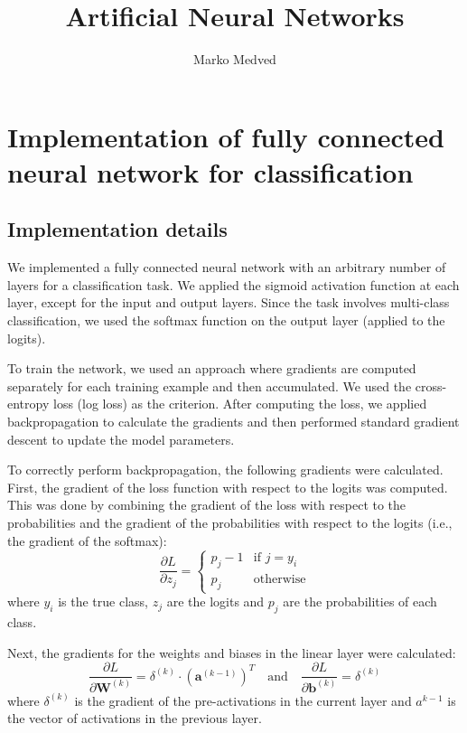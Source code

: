 \documentclass[9pt]{IEEEtran}
\title{\vspace{0ex}
Artificial Neural Networks}
\author{Marko Medved\vspace{-4.0ex}}
\begin{document}
\maketitle

\section{Implementation of fully connected neural network for classification}
\subsection{Implementation details}
We implemented a fully connected neural network with an arbitrary number of layers for
 a classification task. We applied the sigmoid activation function at each layer, except
  for the input and output layers. Since the task involves multi-class classification,
   we used the softmax function on the output layer (applied to the logits).

To train the network, we used an approach where gradients are computed 
separately for each training example and then accumulated. We used the 
cross-entropy loss (log loss) as the criterion. After computing the loss,
 we applied backpropagation to calculate the gradients and then performed 
 standard gradient descent to update the model parameters. 

 To correctly perform backpropagation, the following gradients were calculated. 
 First, the gradient of the loss function with respect to the logits was computed. 
 This was done by combining the gradient of the loss with respect to the probabilities 
 and the gradient of the probabilities with respect to the logits (i.e., the gradient of the softmax):
\[
\frac{\partial L}{\partial z_j} =
\begin{cases}
p_j - 1 & \text{if } j = y_i \\
p_j & \text{otherwise}
\end{cases}
\]
where $y_i$ is the true class, $z_j$ are the logits and $p_j$ are the probabilities of 
each class. 

Next, the gradients for the weights and biases in the linear layer were calculated:
\[
\frac{\partial L}{\partial \mathbf{W}^{(k)}} = \delta^{(k)} \cdot \left( \mathbf{a}^{(k-1)} \right)^T
\quad \text{and} \quad
\frac{\partial L}{\partial \mathbf{b}^{(k)}} = \delta^{(k)}
\]
where $ \delta^{(k)}$ is the gradient of the  pre-activations in the current layer and $a^{k-1}$ is the 
vector of activations in the previous layer. 
\end{document}
